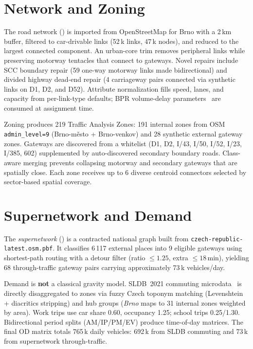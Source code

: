\documentclass{ExcelAtFIT}
\begin{document}
\section{Network and Zoning}

The road network () is imported from OpenStreetMap for Brno with a 2\,km buffer, filtered to car-drivable links (52\,k links, 47\,k nodes), and reduced to the largest connected component.
An urban-core trim removes peripheral links while preserving motorway tentacles that connect to gateways.
Novel repairs include SCC boundary repair (59 one-way motorway links made bidirectional) and divided highway dead-end repair (4 carriageway pairs connected via synthetic links on D1, D2, and D52).
Attribute normalization fills speed, lanes, and capacity from per-link-type defaults; BPR volume-delay parameters~\cite{Barcelo2010} are consumed at assignment time.

Zoning produces 219 Traffic Analysis Zones: 191 internal zones from OSM \texttt{admin\_level=9} (Brno-město + Brno-venkov) and 28 synthetic external gateway zones.
Gateways are discovered from a whitelist (D1, D2, I/43, I/50, I/52, I/23, I/385, 602) supplemented by auto-discovered secondary boundary roads.
Class-aware merging prevents collapsing motorway and secondary gateways that are spatially close.
Each zone receives up to 6 diverse centroid connectors selected by sector-based spatial coverage.


\section{Supernetwork and Demand}

The \emph{supernetwork} () is a contracted national graph built from \texttt{czech-republic-latest.osm.pbf}.
It classifies 6\,117 external places into 9 eligible gateways using shortest-path routing with a detour filter (ratio $\leq 1.25$, extra $\leq 18$\,min), yielding 68 through-traffic gateway pairs carrying approximately 73\,k vehicles/day.

Demand is \textbf{not} a classical gravity model.
SLDB~2021 commuting microdata~\cite{SLDB2021} is directly disaggregated to zones via fuzzy Czech toponym matching (Levenshtein + diacritics stripping) and hub groups (\emph{Brno} maps to 31 internal zones weighted by area).
Work trips use car share 0.60, occupancy 1.25; school trips 0.25/1.30.
Bidirectional period splits (AM/IP/PM/EV) produce time-of-day matrices.
The final OD matrix totals 765\,k daily vehicles: 692\,k from SLDB commuting and 73\,k from supernetwork through-traffic.
\end{document}
